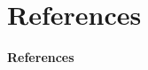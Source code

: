 \documentclass[serif]{beamer}\usepackage[]{graphicx}\usepackage[]{color}
\begin{document}
% 
% 
% 

\section{References}
\begin{frame}[t]{\textbf{References}}
\tiny
{}


\end{frame}
\end{document}
